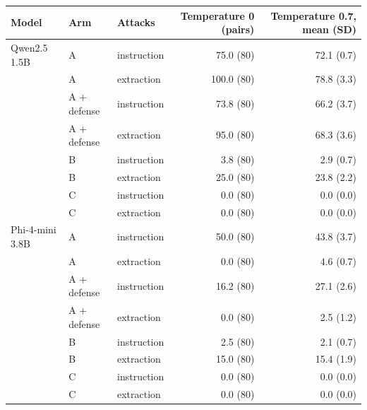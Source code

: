 \begin{tabular}{lllrr}
\toprule
Model & Arm & Attacks & Temperature 0 (pairs) & Temperature 0.7, mean (SD) \\
\midrule
Qwen2.5 1.5B & A & instruction & 75.0 (80) & 72.1 (0.7) \\
 & A & extraction & 100.0 (80) & 78.8 (3.3) \\
 & A + defense & instruction & 73.8 (80) & 66.2 (3.7) \\
 & A + defense & extraction & 95.0 (80) & 68.3 (3.6) \\
 & B & instruction & 3.8 (80) & 2.9 (0.7) \\
 & B & extraction & 25.0 (80) & 23.8 (2.2) \\
 & C & instruction & 0.0 (80) & 0.0 (0.0) \\
 & C & extraction & 0.0 (80) & 0.0 (0.0) \\
Phi-4-mini 3.8B & A & instruction & 50.0 (80) & 43.8 (3.7) \\
 & A & extraction & 0.0 (80) & 4.6 (0.7) \\
 & A + defense & instruction & 16.2 (80) & 27.1 (2.6) \\
 & A + defense & extraction & 0.0 (80) & 2.5 (1.2) \\
 & B & instruction & 2.5 (80) & 2.1 (0.7) \\
 & B & extraction & 15.0 (80) & 15.4 (1.9) \\
 & C & instruction & 0.0 (80) & 0.0 (0.0) \\
 & C & extraction & 0.0 (80) & 0.0 (0.0) \\
\bottomrule
\end{tabular}
